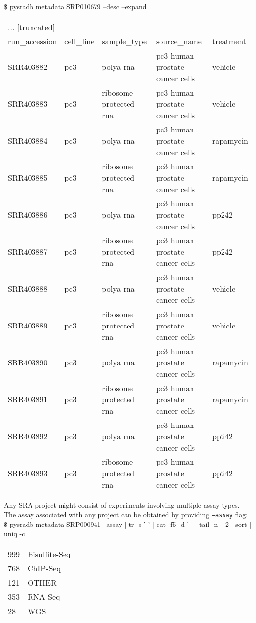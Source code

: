 \documentclass[9pt,a4paper]{extarticle}
\newenvironment{allintypewriter}{\ttfamily}{\par}
\begin{document}
\begin{allintypewriter}
\$ pysradb metadata SRP010679 --desc --expand
\begin{table}[H]
    \begin{tabular}{lllll}
    ... [truncated]\\
run_accession & cell_line & sample_type &  source_name &  treatment\\
SRR403882 & pc3 & polya rna & pc3 human prostate cancer cells & vehicle\\
SRR403883 & pc3 & ribosome protected rna & pc3 human prostate cancer cells & vehicle\\
SRR403884 & pc3 & polya rna & pc3 human prostate cancer cells & rapamycin\\
SRR403885 & pc3 & ribosome protected rna & pc3 human prostate cancer cells & rapamycin\\
SRR403886 & pc3 & polya rna & pc3 human prostate cancer cells & pp242\\
SRR403887 & pc3 & ribosome protected rna & pc3 human prostate cancer cells & pp242\\
SRR403888 & pc3 & polya rna & pc3 human prostate cancer cells & vehicle\\
SRR403889 & pc3 & ribosome protected rna & pc3 human prostate cancer cells & vehicle\\
SRR403890 & pc3 & polya rna & pc3 human prostate cancer cells & rapamycin\\
SRR403891 & pc3 & ribosome protected rna & pc3 human prostate cancer cells & rapamycin\\
SRR403892 & pc3 & polya rna & pc3 human prostate cancer cells & pp242\\
SRR403893 & pc3 & ribosome protected rna & pc3 human prostate cancer cells & pp242\\
 \end{tabular}
\end{table}
\end{allintypewriter}

Any SRA project might consist of experiments involving multiple assay types.
The assay associated with any project can be obtained by providing
\texttt{--assay} flag:\\

\begin{allintypewriter}
\$ pysradb metadata SRP000941 --assay  | tr -s '  ' | cut -f5 -d ' ' | tail -n +2 | sort | uniq -c
\begin{table}[H]
    \begin{tabular}{ll}
        999  & Bisulfite-Seq\\
        768 & ChIP-Seq\\
        121 & OTHER\\
        353 & RNA-Seq\\
        28 & WGS\\
    \end{tabular}
\end{table}
\end{allintypewriter}
\end{document}
